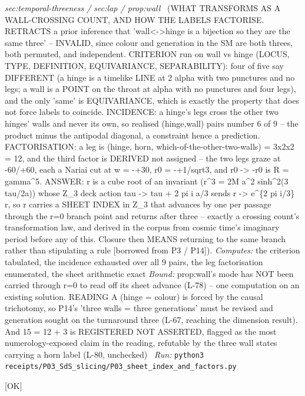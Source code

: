 \begin{description}
\textit{sec:temporal-threeness / sec:lap / prop:wall} \ (WHAT TRANSFORMS AS A WALL-CROSSING COUNT, AND HOW THE LABELS FACTORISE. RETRACTS a prior inference that 'wall<->hinge is a bijection so they are the same three' -- INVALID, since colour and generation in the SM are both threes, both permuted, and independent. CRITERION run on wall vs hinge (LOCUS, TYPE, DEFINITION, EQUIVARIANCE, SEPARABILITY): four of five say DIFFERENT (a hinge is a timelike LINE at 2 alpha with two punctures and no legs; a wall is a POINT on the throat at alpha with no punctures and four legs), and the only 'same' is EQUIVARIANCE, which is exactly the property that does not force labels to coincide. INCIDENCE: a hinge's legs cross the other two hinges' walls and never its own, so realised (hinge,wall) pairs number 6 of 9 -- the product minus the antipodal diagonal, a constraint hence a prediction. FACTORISATION: a leg is (hinge, horn, which-of-the-other-two-walls) = 3x2x2 = 12, and the third factor is DERIVED not assigned -- the two legs graze at -60/+60, each a Nariai cut at w = -+30, r0 = -+1/sqrt3, and r0 -> -r0 is R = gamma\textasciicircum{}5. ANSWER: r is a cube root of an invariant (r\textasciicircum{}3 = 2M a\textasciicircum{}2 sinh\textasciicircum{}2(3 tau/2a)) whose Z\_3 deck action tau -> tau + 2 pi i a/3 sends r -> e\textasciicircum{}\{2 pi i/3\} r, so r carries a SHEET INDEX in Z\_3 that advances by one per passage through the r=0 branch point and returns after three -- exactly a crossing count's transformation law, and derived in the corpus from cosmic time's imaginary period before any of this. Closure then MEANS returning to the same branch rather than stipulating a rule [borrowed from P3 / P14]). 
\emph{Computes:} the criterion tabulated, the incidence exhausted over all 9 pairs, the leg factorisation enumerated, the sheet arithmetic exact
 \emph{Bound:} prop:wall's mode has NOT been carried through r=0 to read off its sheet advance (L-78) -- one computation on an existing solution. READING A (hinge = colour) is forced by the causal trichotomy, so P14's 'three walls = three generations' must be revised and generation sought on the turnaround three (L-67, reaching the dimension result). And 15 = 12 + 3 is REGISTERED NOT ASSERTED, flagged as the most numerology-exposed claim in the reading, refutable by the three wall states carrying a horn label (L-80, unchecked)
\ \emph{Run:} \texttt{python3 receipts/P03\_SdS\_slicing/P03\_sheet\_index\_and\_factors.py}
\item[\rcptlabel{P03_wall_is_the_graze_point}{P3R48}\textbf{P3R48}\quad\texttt{P03\_wall\_is\_the\_graze\_point}]\hfill\textsf{[OK]}\\

\end{description}
